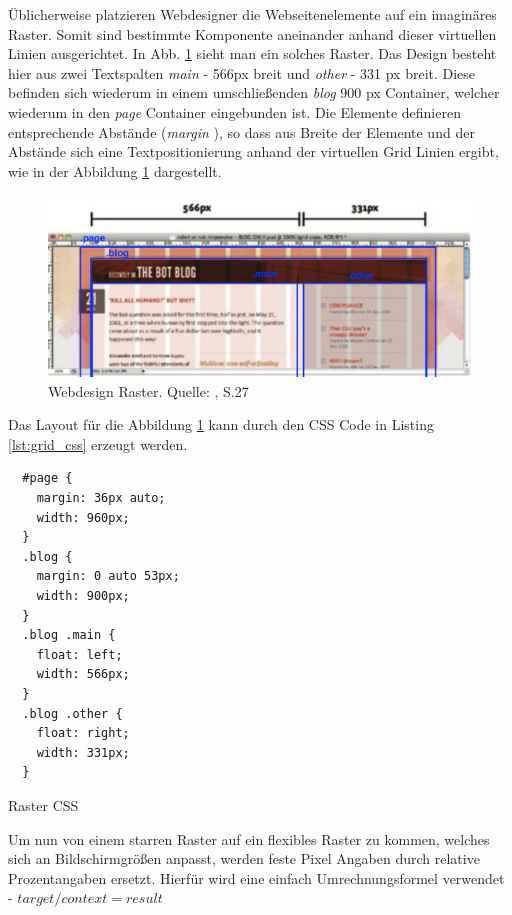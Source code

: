 Üblicherweise platzieren Webdesigner die Webseitenelemente auf ein imaginäres Raster. Somit sind bestimmte Komponente aneinander anhand dieser virtuellen Linien ausgerichtet. In Abb. \ref{fig:grid} sieht man ein solches Raster. Das Design besteht hier aus zwei Textspalten \emph{main} - 566px breit und \emph{other} - 331 px breit. Diese befinden sich wiederum in einem umschließenden  \emph{blog} 900 px Container, welcher wiederum in den \emph{page} Container eingebunden ist. Die Elemente definieren entsprechende Abstände (\emph{margin} ), so dass aus Breite der Elemente und der Abstände sich eine Textpositionierung anhand der virtuellen Grid Linien ergibt, wie in der Abbildung \ref{fig:grid} dargestellt.

\begin{figure}[htp]     %
\centering
\includegraphics[width=1.0\textwidth]{images/grid}
\caption{Webdesign Raster. Quelle: \cite{Marcotte:2011}, S.27}\label{fig:grid}
\end{figure}

Das Layout für die Abbildung \ref{fig:grid} kann durch den CSS Code in Listing \ref{lst:grid_css} erzeugt werden.

\begin{listing}[H]
\begin{verbatim}
  #page {
    margin: 36px auto;
    width: 960px;
  }
  .blog {
    margin: 0 auto 53px;
    width: 900px;
  }
  .blog .main {
    float: left;
    width: 566px;
  }
  .blog .other {
    float: right;
    width: 331px;
  }
\end{verbatim}
\caption{Raster CSS}
\label{lst:grid_css}
\end{listing}

Um nun von einem starren Raster auf ein flexibles Raster zu kommen, welches sich an Bildschirmgrößen anpasst, werden feste Pixel Angaben durch relative Prozentangaben ersetzt. Hierfür wird eine einfach Umrechnungsformel verwendet - $target / context = result$

